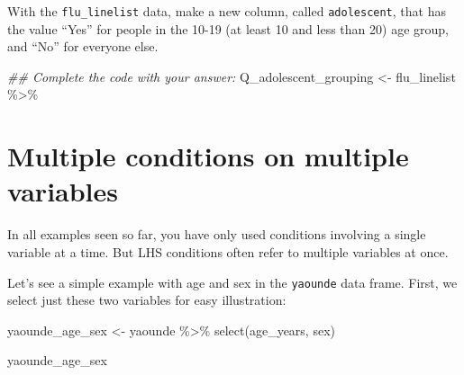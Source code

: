 \documentclass[
  letterpaper,
  DIV=11,
  numbers=noendperiod]{scrreprt}
\newenvironment{Shaded}{\begin{snugshade}}{\end{snugshade}}
\newcommand{\DocumentationTok}[1]{\textcolor[rgb]{0.37,0.37,0.37}{\textit{#1}}}
\newcommand{\FunctionTok}[1]{\textcolor[rgb]{0.28,0.35,0.67}{#1}}
\newcommand{\NormalTok}[1]{\textcolor[rgb]{0.00,0.23,0.31}{#1}}
\newcommand{\OtherTok}[1]{\textcolor[rgb]{0.00,0.23,0.31}{#1}}
\newcommand{\SpecialCharTok}[1]{\textcolor[rgb]{0.37,0.37,0.37}{#1}}
\begin{document}
\begin{tcolorbox}[enhanced jigsaw, colframe=quarto-callout-tip-color-frame, rightrule=.15mm, opacityback=0, breakable, coltitle=black, colbacktitle=quarto-callout-tip-color!10!white, bottomrule=.15mm, leftrule=.75mm, toprule=.15mm, arc=.35mm, bottomtitle=1mm, colback=white, left=2mm, opacitybacktitle=0.6, titlerule=0mm, title=\textcolor{quarto-callout-tip-color}{\faLightbulb}\hspace{0.5em}{Practice}, toptitle=1mm]

With the \texttt{flu\_linelist} data, make a new column, called
\texttt{adolescent}, that has the value ``Yes'' for people in the 10-19
(at least 10 and less than 20) age group, and ``No'' for everyone else.

\begin{Shaded}
\begin{Highlighting}[]
\DocumentationTok{\#\# Complete the code with your answer:}
\NormalTok{Q\_adolescent\_grouping }\OtherTok{\textless{}{-}} 
\NormalTok{  flu\_linelist }\SpecialCharTok{\%\textgreater{}\%} 
\end{Highlighting}
\end{Shaded}

\end{tcolorbox}

\hypertarget{multiple-conditions-on-multiple-variables}{%
\section{Multiple conditions on multiple
variables}\label{multiple-conditions-on-multiple-variables}}

In all examples seen so far, you have only used conditions involving a
single variable at a time. But LHS conditions often refer to multiple
variables at once.

Let's see a simple example with age and sex in the \texttt{yaounde} data
frame. First, we select just these two variables for easy illustration:

\begin{Shaded}
\begin{Highlighting}[]
\NormalTok{yaounde\_age\_sex }\OtherTok{\textless{}{-}} 
\NormalTok{  yaounde }\SpecialCharTok{\%\textgreater{}\%} 
  \FunctionTok{select}\NormalTok{(age\_years, sex)}

\NormalTok{yaounde\_age\_sex}
\end{Highlighting}
\end{Shaded}
\end{document}
